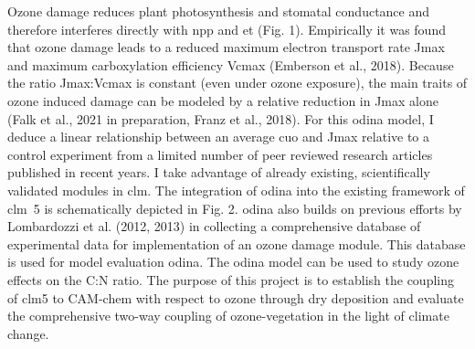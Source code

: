 

Ozone damage reduces plant photosynthesis and stomatal conductance and therefore interferes directly with \gls{npp} and \gls{et} (Fig. 1). Empirically it was found that ozone damage leads to a reduced maximum electron transport rate Jmax and maximum carboxylation efficiency Vcmax (Emberson et al., 2018). Because the ratio Jmax:Vcmax is constant (even under ozone exposure), the main traits of ozone induced damage can be modeled by a relative reduction in Jmax alone (Falk et al., 2021 in preparation, Franz et al., 2018). For this \gls{odina} model, I deduce a linear relationship between an average \gls{cuo} and Jmax relative to a control experiment from a limited number of peer reviewed research articles published in recent years. I take advantage of already existing, scientifically validated modules in \gls{clm}. The integration of \gls{odina} into the existing framework of \gls{clm}~5 is schematically depicted in Fig. 2. \gls{odina} also builds on previous efforts by Lombardozzi et al. (2012, 2013) in collecting a comprehensive database of experimental data for implementation of an ozone damage module. This database is used for model evaluation \gls{odina}. The \gls{odina} model can be used to study ozone effects on the C:N ratio. The purpose of this project is to establish the coupling of \gls{clm}5 to CAM-chem with respect to ozone through dry deposition and evaluate the comprehensive two-way coupling of ozone-vegetation in the light of climate change.
